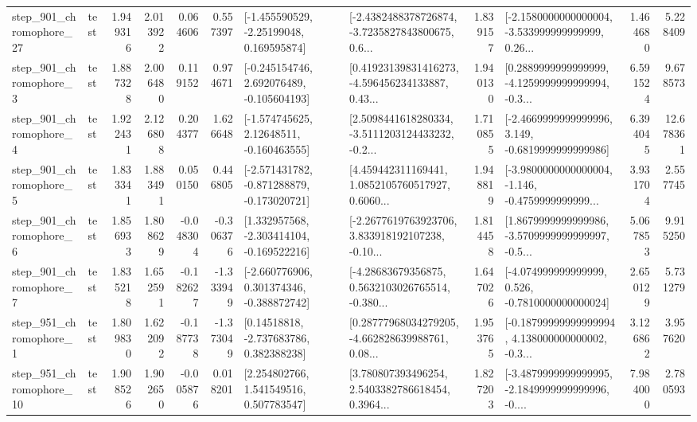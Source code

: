 \begin{tabular}{llrrrrllrlrr}
  step\_901\_chromophore\_27 &      test &      1.949316 &    2.013922 &      0.064606 &  0.557397 &    [-1.455590529, -2.25199048, 0.169595874] &  [-2.4382488378726874, -3.7235827843800675, 0.6... &       1.839157 &  [-2.1580000000000004, -3.533999999999999, 0.26... &            1.464680 &          5.228409 \\
   step\_901\_chromophore\_3 &      test &      1.887328 &    2.006480 &      0.119152 &  0.974671 &   [-0.245154746, 2.692076489, -0.105604193] &  [0.41923139831416273, -4.596456234133887, 0.43... &       1.940130 &  [0.2889999999999999, -4.1259999999999994, -0.3... &            6.591524 &          9.678573 \\
   step\_901\_chromophore\_4 &      test &      1.922431 &    2.126808 &      0.204377 &  1.626648 &    [-1.574745625, 2.12648511, -0.160463555] &  [2.5098441618280334, -3.5111203124433232, -0.2... &       1.710855 &  [-2.4669999999999996, 3.149, -0.6819999999999986] &            6.394045 &         12.678361 \\
   step\_901\_chromophore\_5 &      test &      1.833341 &    1.883491 &      0.050150 &  0.446805 &  [-2.571431782, -0.871288879, -0.173020721] &  [4.459442311169441, 1.0852105760517927, 0.6060... &       1.948819 &  [-3.9800000000000004, -1.146, -0.4759999999999... &            3.931704 &          2.557745 \\
   step\_901\_chromophore\_6 &      test &      1.856933 &    1.808629 &     -0.048304 & -0.306376 &   [1.332957568, -2.303414104, -0.169522216] &  [-2.2677619763923706, 3.833918192107238, -0.10... &       1.814458 &  [1.8679999999999986, -3.5709999999999997, -0.5... &            5.067853 &          9.915250 \\
   step\_901\_chromophore\_7 &      test &      1.835218 &    1.652591 &     -0.182627 & -1.333949 &   [-2.660776906, 0.301374346, -0.388872742] &  [-4.28683679356875, 0.5632103026765514, -0.380... &       1.647026 &   [-4.074999999999999, 0.526, -0.7810000000000024] &            2.650129 &          5.731279 \\
   step\_951\_chromophore\_1 &      test &      1.809830 &    1.622092 &     -0.187738 & -1.373049 &     [0.14518818, -2.737683786, 0.382388238] &  [0.28777968034279205, -4.662828639988761, 0.08... &       1.953765 &  [-0.18799999999999994, 4.138000000000002, -0.3... &            3.126862 &          3.957620 \\
  step\_951\_chromophore\_10 &      test &      1.908526 &    1.902650 &     -0.005876 &  0.018201 &     [2.254802766, 1.541549516, 0.507783547] &  [3.780807393496254, 2.5403382786618454, 0.3964... &       1.827203 &  [-3.4879999999999995, -2.1849999999999996, -0.... &            7.984000 &          2.780593 \\

\end{tabular}
